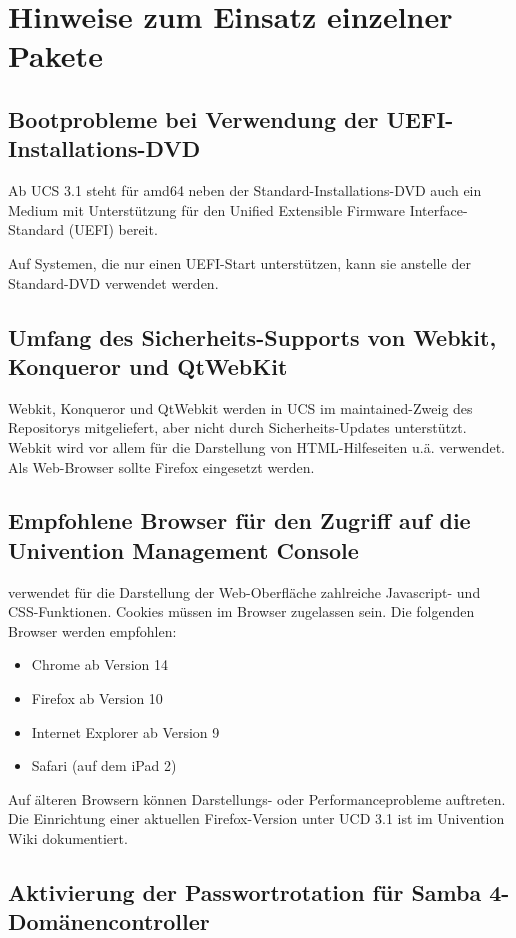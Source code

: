 \chapter{Hinweise zum Einsatz einzelner Pakete}

\section{Bootprobleme bei Verwendung der UEFI-Installations-DVD}
Ab UCS 3.1 steht für amd64 neben der Standard-Installations-DVD auch
ein Medium mit Unterstützung für den Unified Extensible Firmware
Interface-Standard (UEFI) bereit.

Auf Systemen, die nur einen UEFI-Start unterstützen, kann sie anstelle
der Standard-DVD verwendet werden.

\section{Umfang des Sicherheits-Supports von Webkit, Konqueror und QtWebKit}
Webkit, Konqueror und QtWebkit werden in UCS im maintained-Zweig des
Repositorys mitgeliefert, aber nicht durch Sicherheits-Updates
unterstützt. Webkit wird vor allem für die Darstellung von
HTML-Hilfeseiten u.ä. verwendet. Als Web-Browser sollte Firefox
eingesetzt werden.

\section{Empfohlene Browser für den Zugriff auf die Univention Management Console}

\ucsUMC{} verwendet für die Darstellung der Web-Oberfläche zahlreiche
Javascript- und CSS-Funktionen. Cookies müssen im Browser zugelassen
sein. Die folgenden Browser werden empfohlen:

\begin{itemize}
\item Chrome ab Version 14
\item Firefox ab Version 10
\item Internet Explorer ab Version 9
\item Safari (auf dem iPad 2)
\end{itemize}

Auf älteren Browsern können Darstellungs- oder Performanceprobleme
auftreten. Die Einrichtung einer aktuellen Firefox-Version unter UCD
3.1 ist im Univention Wiki \cite{ucd-firefox7} dokumentiert.

\section{Aktivierung der Passwortrotation für Samba 4-Domänencontroller}

